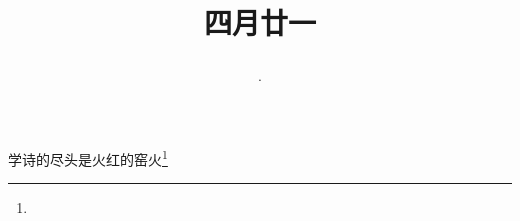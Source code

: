 \title{\date[d=28,m=5,y=2024][year:cn-y,年,month:cn,day:cn,日,·,weekday]·四月廿一 }
学诗的尽头是火红的窑火\footnote{ }

